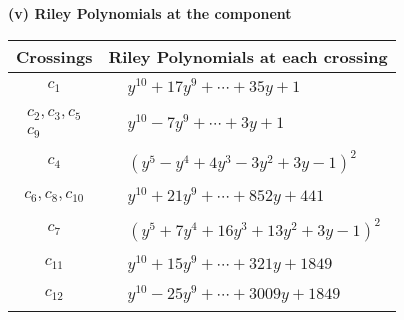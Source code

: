 \documentclass[1p]{elsarticle_modified}
\theoremstyle{definition}
\begin{document}
\newpage\renewcommand{\arraystretch}{1}
\flushleft \textbf{(v) Riley Polynomials at the component}\newline \\
\begin{tabular}{m{50pt}|m{274pt}}
Crossings & \hspace{64pt}Riley Polynomials at each crossing \\
\hline $$\begin{aligned}c_{1}\end{aligned}$$&$\begin{aligned}
&y^{10}+17 y^9+\cdots+35 y+1
\end{aligned}$\\
\hline $$\begin{aligned}c_{2},c_{3},c_{5}\\c_{9}\end{aligned}$$&$\begin{aligned}
&y^{10}-7 y^9+\cdots+3 y+1
\end{aligned}$\\
\hline $$\begin{aligned}c_{4}\end{aligned}$$&$\begin{aligned}
&(y^5- y^4+4 y^3-3 y^2+3 y-1)^2
\end{aligned}$\\
\hline $$\begin{aligned}c_{6},c_{8},c_{10}\end{aligned}$$&$\begin{aligned}
&y^{10}+21 y^9+\cdots+852 y+441
\end{aligned}$\\
\hline $$\begin{aligned}c_{7}\end{aligned}$$&$\begin{aligned}
&(y^5+7 y^4+16 y^3+13 y^2+3 y-1)^2
\end{aligned}$\\
\hline $$\begin{aligned}c_{11}\end{aligned}$$&$\begin{aligned}
&y^{10}+15 y^9+\cdots+321 y+1849
\end{aligned}$\\
\hline $$\begin{aligned}c_{12}\end{aligned}$$&$\begin{aligned}
&y^{10}-25 y^9+\cdots+3009 y+1849
\end{aligned}$\\
\hline
\end{tabular}\\~\\
\end{document}
